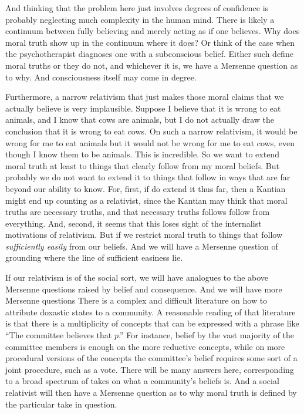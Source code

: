 And thinking that the problem here just involves degrees of confidence is probably neglecting much complexity in the human
mind. There is likely a continuum between fully believing and merely acting as if one believes. Why does moral truth show up
in the continuum where it does? Or think of the case when the psychotherapist diagnoses one with a subconscious belief.
Either such define moral truths or they do not, and whichever it is, we have a Mersenne question as to why. And consciousness
itself may come in degree.

Furthermore, a narrow relativism that just makes those moral claims that we actually believe is very implausible. Suppose I believe that it is wrong
to eat animals, and I know that cows are animals, but I do not actually draw the conclusion that it is wrong to eat cows.
On such a narrow relativism, it would be wrong for me to eat animals but it would not be wrong for me to eat cows, even though
I know them to be animals. This is incredible. So we want to extend moral truth at least to things that clearly follow from my moral beliefs.
But probably we do not want to extend it to things that follow in ways that are far beyond our ability to know. For, first,
if do extend it thus far, then a Kantian might end up counting as a relativist, since the Kantian may think that moral truths are
necessary truths, and that necessary truths follows follow from everything. And, second, it seems that this loses sight of the 
internalist motivations of relativism. But if we restrict moral truth to things that follow \textit{sufficiently easily} from
our beliefs. And we will have a Mersenne question of grounding where the line of sufficient easiness lie.

If our relativism is of the social sort, we will have analogues to the above Mersenne questions raised by belief and consequence.  And we 
will have more Mersenne questions There is a complex and difficult literature on how to attribute doxastic states to a community. A reasonable
reading of that literature is that there is a multiplicity of concepts that can be expressed with a phrase like ``The committee believes 
that $p$.'' For instance, belief by the vast majority of the committee members is enough on the more reductive concepts, 
while on more procedural versions of the concepts the committee's belief requires some sort of a joint procedure, such as a vote. 
There will be many answers here, corresponding to a broad spectrum of takes on what a community's beliefs is. And a social relativist
will then have a Mersenne question as to why moral truth is defined by the particular take in question.

